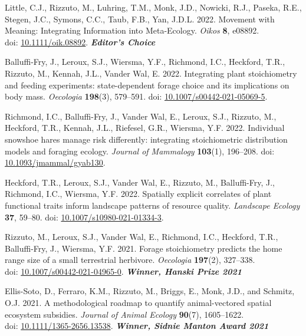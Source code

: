 \documentclass[11pt, letterpaper]{awesome-cv}
\begin{document}
\begin{etaremune}[topsep=0pt,itemsep=1pt,partopsep=0pt,parsep=0pt]
  \item Little, C.J.\textsuperscript{\textdagger}, \textcolor{awesome}{Rizzuto, M.}\textsuperscript{\textdagger}, Luhring, T.M., Monk, J.D., Nowicki, R.J., Paseka, R.E., Stegen, J.C., Symons, C.C., Taub, F.B., Yan, J.D.L. 2022. Movement with Meaning: Integrating Information into Meta-Ecology. \emph{Oikos} \textbf{8}, e08892.\\ doi: \href{https://doi.org/10.1111/oik.08892}{10.1111/oik.08892}. \null\hfill\textbf{\textit{Editor's Choice}}
  \item Balluffi-Fry, J., Leroux, S.J., Wiersma, Y.F., Richmond, I.C., Heckford, T.R., \textcolor{awesome}{Rizzuto, M.}, Kennah, J.L., Vander Wal, E. 2022. Integrating plant stoichiometry and feeding experiments: state-dependent forage choice and its implications on body mass. \emph{Oecologia} \textbf{198}(3), 579--591. doi: \href{https://rdcu.be/cAY5a}{10.1007/s00442-021-05069-5}.
  \item Richmond, I.C., Balluffi-Fry, J., Vander Wal, E., Leroux, S.J., \textcolor{awesome}{Rizzuto, M.}, Heckford, T.R., Kennah, J.L., Riefesel, G.R., Wiersma, Y.F. 2022. Individual snowshoe hares manage risk differently: integrating stoichiometric distribution models and foraging ecology. \emph{Journal of Mammalogy} \textbf{103}(1), 196--208. doi: \href{https://academic.oup.com/jmammal/advance-article/doi/10.1093/jmammal/gyab130/6441781?guestAccessKey=8f89e422-7fb9-4ce9-a9dc-ccf46f3dd0cc}{10.1093/jmammal/gyab130}.
  \item Heckford, T.R., Leroux, S.J., Vander Wal, E., \textcolor{awesome}{Rizzuto, M.}, Balluffi-Fry, J., Richmond, I.C., Wiersma, Y.F. 2022. Spatially explicit correlates of plant functional traits inform landscape patterns of resource quality. \emph{Landscape Ecology} \textbf{37}, 59--80. doi: \href{https://doi.org/10.1007/s10980-021-01334-3}{10.1007/s10980-021-01334-3}.
  \item \textcolor{awesome}{Rizzuto, M.}, Leroux, S.J., Vander Wal, E., Richmond, I.C., Heckford, T.R., Balluffi-Fry, J., Wiersma, Y.F. 2021. Forage stoichiometry predicts the home range size of a small terrestrial herbivore. \emph{Oecologia} \textbf{197}(2), 327--338.\\ doi: \href{https://rdcu.be/cSX31}{10.1007/s00442-021-04965-0}. \null\hfill\textbf{\textit{Winner, Hanski Prize 2021}}
  \item Ellis-Soto, D.\textsuperscript{\textdagger}, Ferraro, K.M.\textsuperscript{\textdagger}, \textcolor{awesome}{Rizzuto, M.}, Briggs, E., Monk, J.D., and Schmitz, O.J. 2021. A methodological roadmap to quantify animal-vectored spatial ecosystem subsidies. \emph{Journal of Animal Ecology} \textbf{90}(7), 1605--1622.\\ doi: \href{https://doi.org/10.1111/1365-2656.13538}{10.1111/1365-2656.13538}. \null\hfill\textbf{\textit{Winner, Sidnie Manton Award 2021}}

\end{etaremune}
\end{document}
